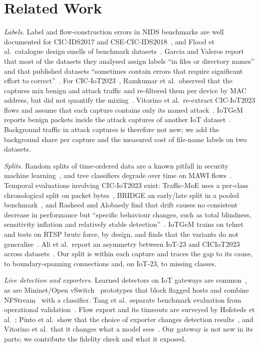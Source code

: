 \section{Related Work}\label{sec:related}

\emph{Labels.} Label and flow-construction errors in NIDS benchmarks are well documented for CIC-IDS2017 and CSE-CIC-IDS2018~\cite{engelen2021troubleshooting,liu2022error}, and Flood et al.\ catalogue design smells of benchmark datasets~\cite{flood2024smells}. Garcia and Valeros report that most of the datasets they analysed assign labels ``in files or directory names'' and that published datasets ``sometimes contain errors that require significant effort to correct''~\cite{garcia2023labeling}. For CIC-IoT2023~\cite{neto2023ciciot2023}, Ramkumar et al.\ observed that the captures mix benign and attack traffic and re-filtered them per device by MAC address, but did not quantify the mixing~\cite{ramkumar2024diagnosing}. Vitorino et al.\ re-extract CIC-IoT2023 flows and assume that each capture contains only its named attack~\cite{vitorino2025revisiting}. IoTGeM reports benign packets inside the attack captures of another IoT dataset~\cite{kostas2024iotgem}. Background traffic in attack captures is therefore not new; we add the background share per capture and the measured cost of file-name labels on two datasets.

\emph{Splits.} Random splits of time-ordered data are a known pitfall in security machine learning~\cite{arp2022dos,pendlebury2019tesseract,apruzzese2023sok}, and tree classifiers degrade over time on MAWI flows~\cite{schraven2026mawiflow}. Temporal evaluations involving CIC-IoT2023 exist: Traffic-MoE uses a per-class chronological split on packet bytes~\cite{zhou2026trafficmoe}, BRIDGE an early/late split in a pooled benchmark~\cite{bridge2026tchnet}, and Rasheed and Alobaedy find that drift causes no consistent decrease in performance but ``specific behaviour changes, such as total blindness, sensitivity inflation and relatively stable detection''~\cite{rasheed2026drift}. IoTGeM trains on telnet and tests on RTSP brute force, by design, and finds that the variants do not generalise~\cite{kostas2024iotgem}. Ali et al.\ report an asymmetry between IoT-23 and CICIoT2023 across datasets~\cite{ali2026siamxbert}. Our split is within each capture and traces the gap to its cause, to boundary-spanning connections and, on IoT-23, to missing classes.

\emph{Live detection and exporters.} Learned detectors on IoT gateways are common~\cite{realguard2022}, as are Mininet/Open vSwitch~\cite{lantz2010mininet,pfaff2015ovs} prototypes that block flagged hosts and combine NFStream~\cite{aouini2022nfstream} with a classifier. Tang et al.\ separate benchmark evaluation from operational validation~\cite{tang2026hybrid}. Flow export and its timeouts are surveyed by Hofstede et al.~\cite{hofstede2014flow}; Pinto et al.\ show that the choice of exporter changes detection results~\cite{pinto2025flowexporter,pinto2025hera}, and Vitorino et al.\ that it changes what a model sees~\cite{vitorino2025revisiting}. Our gateway is not new in its parts; we contribute the fidelity check and what it exposed.

